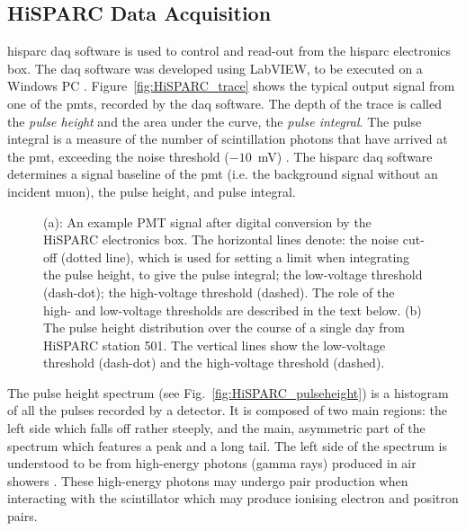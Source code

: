 \subsection{HiSPARC Data Acquisition}

\gls{hisparc} \gls{daq} software is used to control and read-out from the \gls{hisparc} electronics box. The \gls{daq} software was developed using LabVIEW, to be executed on a Windows PC \citep{van_dam_hisparc_2020}. Figure~\ref{fig:HiSPARC_trace} shows the typical output signal from one of the \glspl{pmt}, recorded by the \gls{daq} software. The depth of the trace is called the \textit{pulse height} and the area under the curve, the \textit{pulse integral}. The pulse integral is a measure of the number of scintillation photons that have arrived at the \gls{pmt}, exceeding the noise threshold ($-10$~mV) \citep{van_dam_hisparc_2020}. The \gls{hisparc} \gls{daq} software determines a signal baseline of the \gls{pmt} (i.e. the background signal without an incident muon), the pulse height, and pulse integral.

\begin{figure}[ht!]
	\centering
	
	\caption{(a): An example PMT signal after digital conversion by the HiSPARC electronics box. The horizontal lines denote: the noise cut-off (dotted line), which is used for setting a limit when integrating the pulse height, to give the pulse integral; the low-voltage threshold (dash-dot); the high-voltage threshold (dashed). The role of the high- and low-voltage thresholds are described in the text below. (b) The pulse height distribution over the course of a single day from HiSPARC station 501. The vertical lines show the low-voltage threshold (dash-dot) and the high-voltage threshold (dashed).}
	\label{fig:pulses}
\end{figure}

The pulse height spectrum (see Fig.~\ref{fig:HiSPARC_pulseheight}) is a histogram of all the pulses recorded by a detector. It is composed of two main regions: the left side which falls off rather steeply, and the main, asymmetric part of the spectrum which features a peak and a long tail. The left side of the spectrum is understood to be from high-energy photons (gamma rays) produced in air showers \citep{fokkema_hisparc_2012}. These high-energy photons may undergo pair production when interacting with the scintillator which may produce ionising electron and positron pairs.


